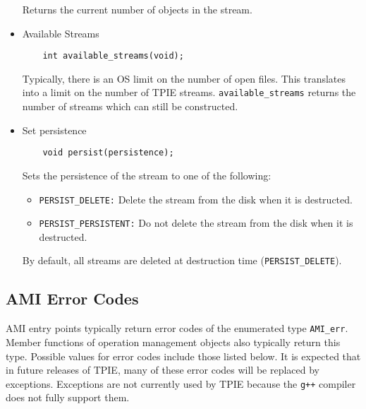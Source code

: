 \begin{itemize}
Returns the current number of objects in the stream.

\item{Available Streams}
\begin{verbatim}
    int available_streams(void);    
\end{verbatim}

Typically, there is an OS limit on the number of open files. This
translates into a limit on the number of TPIE
streams. \verb|available_streams| returns the number of streams which can
still be constructed.

\item{Set persistence}

\begin{verbatim}
    void persist(persistence);
\end{verbatim}

Sets the persistence of the stream to one of the following:
\begin{itemize}
\item \verb|PERSIST_DELETE:| Delete the stream from the disk when it is
  destructed.
\item \verb|PERSIST_PERSISTENT:| Do not delete the stream from the disk when
  it is destructed.
\end{itemize}

By default, all streams are deleted at destruction time
(\verb|PERSIST_DELETE|).
\end{itemize}

\subsection{AMI Error Codes}
\label{sec:ami-errors}

AMI entry points typically return error codes of the
enumerated type \verb|AMI_err|.  Member functions of operation management
objects also typically return this
type.  Possible values for error codes include those listed below.  It is
expected that in future releases of TPIE, many of these error codes will be
replaced by exceptions.  Exceptions are not currently used by TPIE because
the {\tt g++} compiler does not fully support them.

